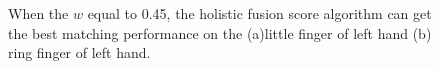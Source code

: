 \begin{figure}[ht!]
    \centering

    \caption{When the $w$ equal to 0.45, the holistic fusion score algorithm can get the best matching performance on the (a)little finger of left hand (b) ring finger of left hand. }
    \label{nonlinear}
\end{figure}

